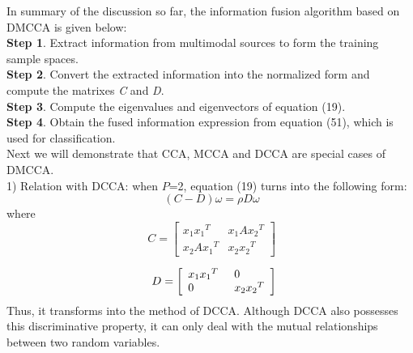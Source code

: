 \documentclass[journal]{IEEEtran}
\begin{document}
In summary of the discussion so far, the information fusion algorithm based on DMCCA is given below:\\\indent
\textbf{Step 1}. Extract information from multimodal sources to form the training sample spaces.\\\indent
\textbf{Step 2}. Convert the extracted information into the normalized form and compute the matrixes \emph{C} and \emph{D}.\\\indent
\textbf{Step 3}. Compute the eigenvalues and eigenvectors of equation (19).\\\indent
\textbf{Step 4}. Obtain the fused information expression from equation (51), which is used for classification.\\

Next we will demonstrate that CCA, MCCA and DCCA are special cases of DMCCA.\\
1)	Relation with DCCA: when $P$=2, equation (19) turns into the following form:
\begin{equation} \ (C - D)\omega  = \rho D\omega \end{equation}
where
\begin{equation} \ C = \left[ \begin{array}{l}
{x_1}{x_1}^T\\
{x_2}A{x_1}^T
\end{array} \right.\left. \begin{array}{l}
{x_1}A{x_2}^T\\
{x_2}{x_2}^T
\end{array} \right] \end{equation}

\begin{equation} \ \;D = \left[ \begin{array}{l}
{x_1}{x_1}^T\\
0
\end{array} \right.\left. \begin{array}{l}
{\rm{  }}0\\
{x_2}{x_2}^T
\end{array} \right] \end{equation}
Thus, it transforms into the method of DCCA. Although DCCA also possesses this discriminative property, it can only deal with the mutual relationships between two random variables.\\
\end{document}
